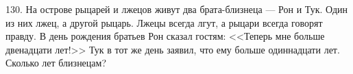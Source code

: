 130. На острове рыцарей и лжецов живут два брата-близнеца --- Рон и Тук. Один из них лжец, а другой рыцарь. Лжецы всегда лгут, а рыцари всегда говорят правду. В день рождения братьев Рон сказал гостям: <<Теперь мне больше двенадцати лет!>> Тук в тот же день заявил, что ему больше одиннадцати лет. Сколько лет близнецам?\\
